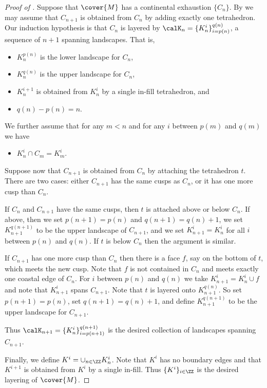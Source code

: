 \documentclass[12pt]{amsart}
\begin{document}
\begin{proof}[Proof of ]
Suppose that $\cover{M}$ has a continental exhaustion $\{C_n\}$.  By  we may assume that $C_{n+1}$ is obtained from $C_n$ by adding exactly one tetrahedron.  Our induction hypothesis is that $C_n$ is layered by $\calK_n = \{K_n^i\}_{i = p(n)}^{q(n)}$, a sequence of $n+1$ spanning landscapes.  That is,
\begin{itemize}
\item
$K_n^{p(n)}$ is the lower landscape for $C_n$,
\item
$K_n^{q(n)}$ is the upper landscape for $C_n$,
\item
$K_n^{i+1}$ is obtained from $K_n^i$ by a single in-fill tetrahedron, and
\item
$q(n) - p(n) = n$.
\end{itemize}
We further assume that for any $m < n$ and for any $i$ between $p(m)$ and $q(m)$ we have
\begin{itemize}
\item
$K_n^i \cap C_m = K_m^i$.
\end{itemize}

Suppose now that $C_{n+1}$ is obtained from $C_n$ by attaching the tetrahedron $t$.  There are two cases: either $C_{n+1}$ has the same cusps as $C_n$, or it has one more cusp than $C_n$. 

If $C_n$ and $C_{n+1}$ have the same cusps, then $t$ is attached above or below $C_n$.  If above, then we set $p(n+1) = p(n)$ and $q(n+1) = q(n) + 1$, we set $K_{n+1}^{q(n+1)}$ to be the upper landscape of $C_{n+1}$, and we set $K_{n+1}^i = K_n^i$ for all $i$ between $p(n)$ and $q(n)$.  If $t$ is below $C_n$ then the argument is similar. 

If $C_{n+1}$ has one more cusp than $C_n$ then there is a face $f$, say on the bottom of $t$, which meets the new cusp.  Note that $f$ is not contained in $C_n$ and meets exactly one coastal edge of $C_n$.  For $i$ between $p(n)$ and $q(n)$ we take $K_{n+1}^i = K_n^i \cup f$ and note that $K_{n+1}^i$ spans $C_{n+1}$.  Note that $t$ is layered onto $K_{n+1}^{q(n)}$.  So set $p(n+1) = p(n)$, set $q(n+1) = q(n) + 1$, and define $K_{n+1}^{q(n+1)}$ to be the upper landscape for $C_{n+1}$.  

Thus $\calK_{n+1} = \{K_n^i\}_{i = p(n+1)}^{q(n+1)}$ is the desired collection of landscapes spanning $C_{n+1}$.

Finally, we define $K^i = \cup_{n \in \ZZ} K_n^i$.  Note that $K^i$ has no boundary edges and that $K^{i+1}$ is obtained from $K^i$ by a single in-fill.  Thus $\{K^i\}_{i \in \ZZ}$ is the desired layering of $\cover{M}$. 
\end{proof}
\end{document}
